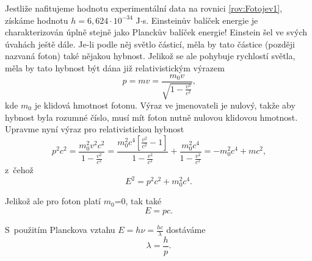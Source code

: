 Jestliže nafitujeme hodnotu  experimentální data na rovnici \ref{rov:Fotojev1}, získáme hodnotu $h= 6,624\cdot10^{-34}$ J$\cdot$s. Einsteinův balíček energie je charakterizován úplně stejně jako Planckův balíček energie! Einstein šel ve svých úvahách ještě dále. Je-li podle něj světlo částicí, měla by tato částice (později nazvaná foton) také nějakou hybnost. Jelikož se ale pohybuje rychlostí světla, měla by tato hybnost být dána již relativistickým výrazem
\begin{equation}
p = mv = \frac{m_0 v}{\sqrt{1-\frac{v^2}{c^2}}}\mbox{,}
\label{rov:Fotojev2}
\end{equation}
kde $m_0$ je klidová hmotnost fotonu. Výraz ve jmenovateli je nulový, takže aby hybnost byla rozumné číslo, musí mít foton nutně nulovou klidovou hmotnost. Upravme nyní výraz pro relativistickou hybnost
\begin{equation}
p^2c^2 = \frac{m_0^2v^2c^2}{1-\frac{v^2}{c^2}} = \frac{m_0^2 c^4 [\frac{v^2}{c^2}-1]}{1-\frac{v^2}{c^2}} + \frac{m_0^2 c^4}{1-\frac{v^2}{c^2}} = -m_0^2 c^4 + mc^2\mbox{,}
\label{Fotojev3}
\end{equation}
z~čehož
\begin{equation}
E^2 = p^2c^2+ m_0^2c^4\mbox{.}
\label{Fotojev4}
\end{equation}

\noindent Jelikož ale pro foton platí $m_0$=0, tak také
\begin{equation}
E=pc\mbox{.}
\label{rov:Fotojev5}
\end{equation}

\noindent S~použitím Planckova vztahu $E = h\nu = \frac{hc}{\lambda}$ dostáváme
\begin{equation}
\boxed{\lambda = \frac{h}{p}\mbox{.}}
\label{rov:Fotojev6}
\end{equation}

